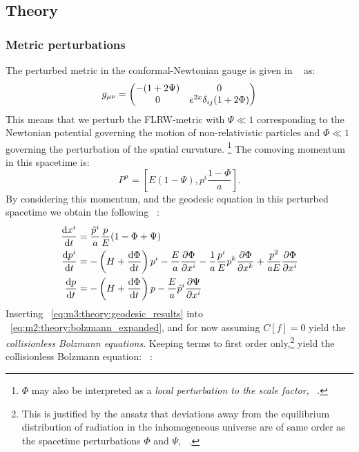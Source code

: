 \subsection{Theory}\label{sec:m3:theory}

\subsubsection{Metric perturbations}
    The perturbed metric in the conformal-Newtonian gauge is given in ~\cite{https://doi.org/10.48550/arxiv.astro-ph/0606683} as:
    \begin{equation}\label{eq:m3:theory:perturbed_metric}
        g_{\mu\nu} = \begin{pmatrix}
            -(1+2\Psi) & 0 \\
            0 & e^{2x}\delta_{ij}(1+2\Phi)
        \end{pmatrix}
    \end{equation}
    This means that we perturb the FLRW-metric with $\Psi\ll1$ corresponding to the Newtonian potential governing the motion of non-relativistic particles and $\Phi\ll1$ governing the perturbation of the spatial curvature. \footnote{$\Phi$ may also be interpreted as a \textit{local perturbation to the scale factor}, ~\cite{dodelson2020modern}.} The comoving momentum in this spacetime is:
    \begin{equation}
        P^\mu = \left[E(1-\Psi), p^i\frac{1-\Phi}{a}\right].
    \end{equation}
    By considering this momentum, and the geodesic equation in this perturbed spacetime we obtain the following ~\cite[Eqs. 3.62, 3.69, 3.71]{dodelson2020modern}:
    \begin{subequations}\label{eq:m3:theory:geodesic_results}
        \begin{align}
            \dv{x^i}{t} &= \frac{\hat{p}^i}{a}\frac{p}{E}(1-\Phi+\Psi) \label{eq:m3:theory:metric_perturb_dxidt}\\
            \dv{p^i}{t} &= -\left(H+\dv{\Phi}{t}\right)p^i-\frac{E}{a}\pdv{\Phi}{x^i}-\frac{1}{a}\frac{p^i}{E}p^k\pdv{\Phi}{x^k} + \frac{p^2}{aE}\pdv{\Phi}{x^i} \label{eq:m3:theory:metric_perturb_dpidt}\\
            \dv{p}{t} &= -\left(H+\dv{\Phi}{t}\right)p-\frac{E}{a}\hat{p}^i\pdv{\Psi}{x^i} \label{eq:m3:theory:metric_perturb_dpdt}
        \end{align}
    \end{subequations}
    Inserting ~\cref{eq:m3:theory:geodesic_results} into ~\cref{eq:m2:theory:bolzmann_expanded}, and for now assuming $C[f]=0$ yield the \textit{collisionless Bolzmann equations}. Keeping terms to first order only,\footnote{This is justified by the ansatz that deviations away from the equilibrium distribution of radiation in the inhomogeneous universe are of same order as the spacetime perturbations $\Phi$ and $\Psi$, ~\cite{dodelson2020modern}.} yield the collisionless Bolzmann equation: ~\cite[Eq. 3.83]{dodelson2020modern}:
